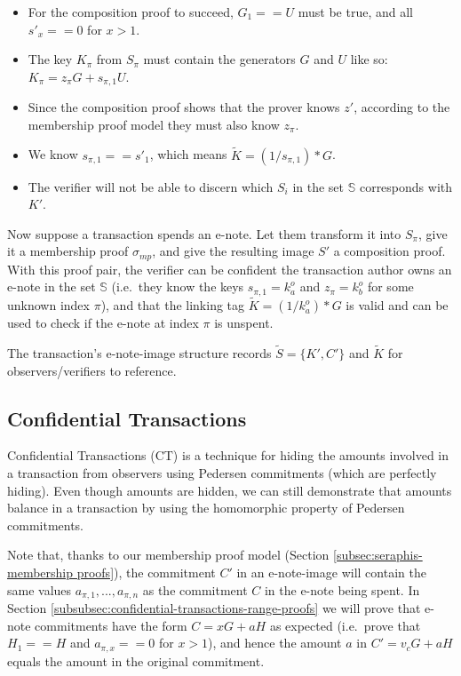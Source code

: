 \begin{itemize}
    \item For the composition proof to succeed, $G_1 == U$ must be true, and all $s'_x == 0$ for $x > 1$.

    \item The key $K_{\pi}$ from $S_{\pi}$ must contain the generators $G$ and $U$ like so: $K_{\pi} = z_{\pi} G + s_{\pi, 1} U$.

    \item Since the composition proof shows that the prover knows $z'$, according to the membership proof model they must also know $z_{\pi}$.

    \item We know $s_{\pi, 1} == s'_1$, which means $\tilde{K} = (1/ s_{\pi, 1})*G$.

    \item The verifier will not be able to discern which $S_i$ in the set $\mathbb{S}$ corresponds with $K'$.
\end{itemize}

Now suppose a transaction spends an e-note. Let them transform it into $S_{\pi}$, give it a membership proof $\sigma_{mp}$, and give the resulting image $S'$ a composition proof. With this proof pair, the verifier can be confident the transaction author owns an e-note in the set $\mathbb{S}$ (i.e.\ they know the keys $s_{\pi,1} = k^o_a$ and $z_{\pi} = k^o_b$ for some unknown index $\pi$), and that the linking tag $\tilde{K} = (1/k^o_a)*G$ is valid and can be used to check if the e-note at index $\pi$ is unspent.

The transaction's e-note-image structure records $\tilde{S} = \{K', C'\}$ and $\tilde{K}$ for observers/verifiers to reference.


\subsection{Confidential Transactions}
\label{subsec:seraphis-confidential-transactions}

Confidential Transactions (CT) \cite{maxwell-ct-2} is a technique for hiding the amounts involved in a transaction from observers using Pedersen commitments (which are perfectly hiding). Even though amounts are hidden, we can still demonstrate that amounts balance in a transaction by using the homomorphic property of Pedersen commitments.

Note that, thanks to our membership proof model (Section \ref{subsec:seraphis-membership proofs}), the commitment $C'$ in an e-note-image will contain the same values $a_{\pi,1},...,a_{\pi,n}$ as the commitment $C$ in the e-note being spent. In Section \ref{subsubsec:confidential-transactions-range-proofs} we will prove that e-note commitments have the form $C = x G + a H$ as expected (i.e.\ prove that $H_1 == H$ and $a_{\pi,x} == 0$ for $x > 1$), and hence the amount $a$ in $C' = v_c G + a H$ equals the amount in the original commitment.

